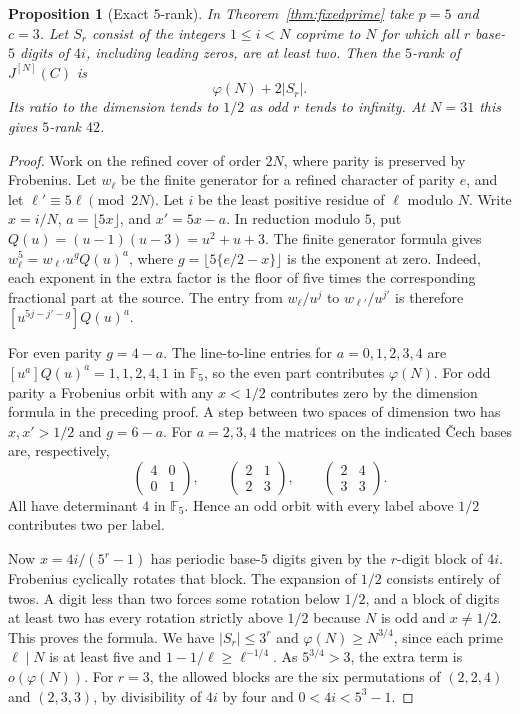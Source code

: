\documentclass[11pt]{article}
\newtheorem{proposition}[theorem]{Proposition}
\newcommand{\F}{\mathbb F}
\begin{document}
\begin{proposition}[Exact \(5\)-rank]\label{prop:rankhalf}
In Theorem~\ref{thm:fixedprime} take \(p=5\) and \(c=3\). Let \(S_r\)
consist of the integers \(1\le i<N\) coprime to \(N\) for which all
\(r\) base-\(5\) digits of \(4i\), including leading zeros, are at
least two. Then the \(5\)-rank of \(J^{[N]}(C)\) is
\[
                      \varphi(N)+2\lvert S_r\rvert.
\]
Its ratio to the dimension tends to \(1/2\) as odd \(r\) tends to
infinity. At \(N=31\) this gives \(5\)-rank \(42\).
\end{proposition}

\begin{proof}
Work on the refined cover of order \(2N\), where parity is preserved
by Frobenius. Let \(w_\ell\) be the finite generator for a refined
character of parity \(e\), and let \(\ell'\equiv5\ell\pmod{2N}\).
Let \(i\) be the least positive residue of \(\ell\) modulo \(N\).
Write \(x=i/N\), \(a=\lfloor5x\rfloor\), and \(x'=5x-a\). In
reduction modulo \(5\), put \(Q(u)=(u-1)(u-3)=u^2+u+3\).
The finite generator formula gives
\(w_\ell^5=w_{\ell'}u^gQ(u)^a\), where
\(g=\lfloor5\{e/2-x\}\rfloor\) is the exponent at zero.
Indeed, each exponent in the extra factor is the floor of five
times the corresponding fractional part at the source.
The entry from \(w_\ell/u^j\) to \(w_{\ell'}/u^{j'}\) is therefore
\([u^{5j-j'-g}]Q(u)^a\).

For even parity \(g=4-a\). The line-to-line entries for
\(a=0,1,2,3,4\) are \([u^a]Q(u)^a=1,1,2,4,1\) in \(\F_5\),
so the even part contributes \(\varphi(N)\).
For odd parity a Frobenius orbit with any \(x<1/2\) contributes zero
by the dimension formula in the preceding proof. A step between two
spaces of dimension two has \(x,x'>1/2\) and \(g=6-a\).
For \(a=2,3,4\) the matrices on the indicated \v{C}ech bases are,
respectively,
\[
 \begin{pmatrix}4&0\\0&1\end{pmatrix},\qquad
 \begin{pmatrix}2&1\\2&3\end{pmatrix},\qquad
 \begin{pmatrix}2&4\\3&3\end{pmatrix}.
\]
All have determinant \(4\) in \(\F_5\). Hence an odd orbit with
every label above \(1/2\) contributes two per label.

Now \(x=4i/(5^r-1)\) has periodic base-\(5\) digits given by the
\(r\)-digit block of \(4i\). Frobenius cyclically rotates that block.
The expansion of \(1/2\) consists entirely of twos. A digit less
than two forces some rotation below \(1/2\), and a block of digits
at least two has every rotation strictly above \(1/2\) because
\(N\) is odd and \(x\ne1/2\). This proves the formula. We have
\(\lvert S_r\rvert\le3^r\) and \(\varphi(N)\ge N^{3/4}\), since
each prime \(\ell\mid N\) is at least five and
\(1-1/\ell\ge\ell^{-1/4}\). As \(5^{3/4}>3\), the extra term is
\(o(\varphi(N))\). For \(r=3\), the allowed blocks are the six
permutations of \((2,2,4)\) and \((2,3,3)\), by divisibility of
\(4i\) by four and \(0<4i<5^3-1\).
\end{proof}
\end{document}
